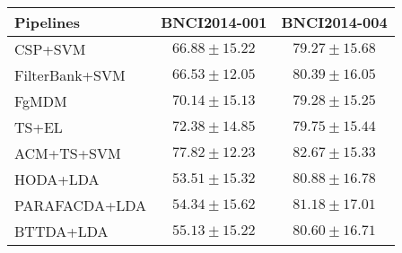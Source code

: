 \begin{tabular}{@{}lcc@{}}
\toprule
     Pipelines &             BNCI2014-001 &             BNCI2014-004 \\
\midrule
       CSP+SVM &          $66.88\pm15.22$ &          $79.27\pm15.68$ \\
FilterBank+SVM &          $66.53\pm12.05$ &          $80.39\pm16.05$ \\
         FgMDM &          $70.14\pm15.13$ &          $79.28\pm15.25$ \\
         TS+EL &          $72.38\pm14.85$ &          $79.75\pm15.44$ \\
    ACM+TS+SVM & \boldmath$77.82\pm12.23$ & \boldmath$82.67\pm15.33$ \\\midrule 
      HODA+LDA &          $53.51\pm15.32$ &          $80.88\pm16.78$ \\
 PARAFACDA+LDA &          $54.34\pm15.62$ &          $81.18\pm17.01$ \\
     BTTDA+LDA &          $55.13\pm15.22$ &          $80.60\pm16.71$ \\
\bottomrule
\end{tabular}

